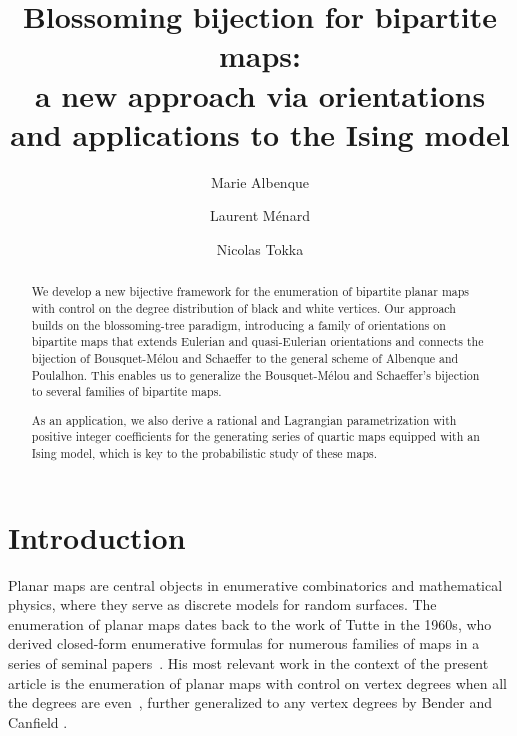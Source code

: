 \documentclass[11pt,reqno,tbtags]{amsart}
\numberwithin{equation}{section}
\numberwithin{theo}{section}
\theoremstyle{definition}
\begin{document}
\title[Blossoming bijection for bipartite maps and Ising model]{Blossoming bijection for bipartite maps:\\ a new approach via orientations\\ and applications to the Ising model} 

\author{Marie Albenque}

\author{Laurent Ménard}

\author{Nicolas Tokka}


\begin{abstract} 
We develop a new bijective framework for the enumeration of bipartite planar maps with control on the degree distribution of black and white vertices. Our approach builds on the blossoming-tree paradigm, introducing a family of orientations on bipartite maps that extends Eulerian and quasi-Eulerian orientations and connects the bijection of Bousquet-Mélou and Schaeffer to the general scheme of Albenque and Poulalhon. This enables us to generalize the Bousquet-Mélou and Schaeffer's bijection to several families of bipartite maps. 

As an application, we also derive a rational and Lagrangian parametrization with positive integer coefficients for the generating series of quartic maps equipped with an Ising model, which is key to the probabilistic study of these maps. 
\end{abstract} 

\maketitle


\tableofcontents



\section*{Introduction}


Planar maps are central objects in enumerative combinatorics and mathematical physics, where they serve as discrete models for random surfaces. The enumeration of planar maps dates back to the work of Tutte in the 1960s, who derived closed-form enumerative formulas for numerous families of maps in a series of seminal papers~\cite{Tutte62,Tutte63, Tutte64, Tutte68, Tutte95}. His most relevant work in the context of the present article is the enumeration of planar maps with control on vertex degrees when all the degrees are even~\cite{Tutte62}, further generalized to any vertex degrees by Bender and Canfield \cite{BeCa94}. 
\end{document}
